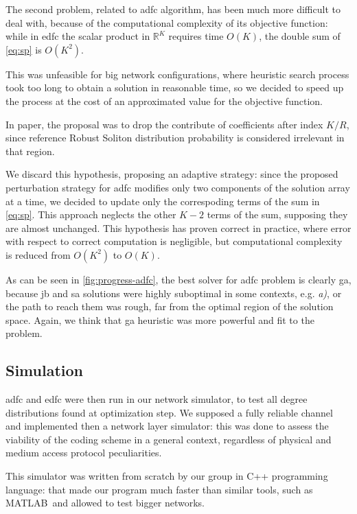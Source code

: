 \documentclass[12pt,journal,draftclsnofoot,onecolumn]{IEEEtran}
\begin{document}
The second problem, related to \gls{adfc} algorithm, has been much more difficult to deal with, because of the computational complexity of its objective function: while in \gls{edfc} the scalar product in $\mathbb{R}^K$ requires time $O(K)$, the double sum of \autoref{eq:sp} is $O(K^2)$.

This was unfeasible for big network configurations, where heuristic search process took too long to obtain a solution in reasonable time, so we decided to speed up the process at the cost of an approximated value for the objective function.

In paper\cite{Lin2007}, the proposal was to drop the contribute of coefficients after index $K/R$, since reference Robust Soliton distribution probability is considered irrelevant in that region.

We discard this hypothesis, proposing an adaptive strategy:
since the proposed perturbation strategy for \gls{adfc} modifies only two components of the solution array at a time, we decided to update only the correspoding terms of the sum in \autoref{eq:sp}.
This approach neglects the other $K-2$ terms of the sum, supposing they are almost unchanged.
This hypothesis has proven correct in practice, where error with respect to correct computation is negligible, but computational complexity is reduced from $O(K^2)$ to $O(K)$.

As can be seen in \autoref{fig:progress-adfc}, the best solver for \gls{adfc} problem is clearly \gls{ga}, because \gls{jb} and \gls{sa} solutions were highly suboptimal in some contexts, e.g. \emph{a)}, or the path to reach them was rough, far from the optimal region of the solution space.
Again, we think that \gls{ga} heuristic was more powerful and fit to the problem.

\subsection{Simulation}
\gls{adfc} and \gls{edfc} were then run in our network simulator, to test all degree distributions found at optimization step.
We supposed a fully reliable channel and implemented then a network layer simulator: this was done to assess the viability of the coding scheme in a general context, regardless of physical and medium access protocol peculiarities.

This simulator was written from scratch by our group in C++ programming language: that made our program much faster than similar tools, such as MATLAB\textregistered\ and allowed to test bigger networks.
\end{document}
